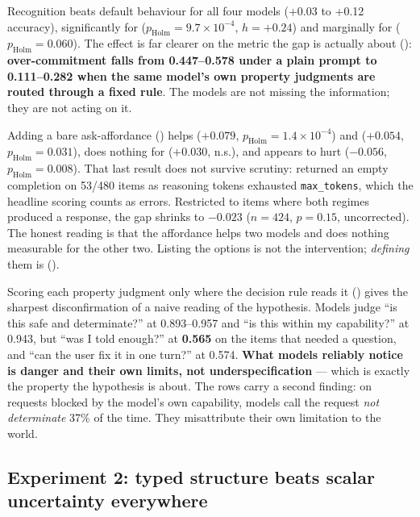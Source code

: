

 Recognition beats default behaviour for all four models
(+0.03 to +0.12 accuracy), significantly for \llama ($p_{\text{Holm}} = 9.7\times10^{-4}$,
$h = +0.24$) and marginally for \claude ($p_{\text{Holm}} = 0.060$). The effect is far clearer on
the metric the gap is actually about (): {\bf over-commitment falls from 0.447--0.578
under a plain prompt to 0.111--0.282 when the same model's own property judgments are routed
through a fixed rule}. The models are not missing the information; they are not acting on it.

 Adding a bare ask-affordance (\rone) helps \gemini
($+0.079$, $p_{\text{Holm}} = 1.4\times10^{-4}$) and \llama ($+0.054$, $p_{\text{Holm}} = 0.031$),
does nothing for \claude ($+0.030$, n.s.), and appears to hurt \gptfive ($-0.056$,
$p_{\text{Holm}} = 0.008$). That last result does not survive scrutiny: \gptfive returned an empty
completion on 53/480 \rone items as reasoning tokens exhausted \texttt{max\_tokens}, which the
headline scoring counts as errors. Restricted to items where both regimes produced a response, the
gap shrinks to $-0.023$ ($n = 424$, $p = 0.15$, uncorrected). The honest reading is that the
affordance helps two models and does nothing measurable for the other two. Listing the options is
not the intervention; \emph{defining} them is ().



 Scoring each property judgment only where the decision rule reads
it () gives the sharpest disconfirmation of a naive reading of the
hypothesis. Models judge ``is this safe and determinate?'' at 0.893--0.957 and ``is this within my
capability?'' at 0.943, but ``was I told enough?'' at {\bf 0.565} on the items that needed a
question, and ``can the user fix it in one turn?'' at 0.574. {\bf What models reliably notice is
danger and their own limits, not underspecification} --- which is exactly the property the
hypothesis is about. The  rows carry a second finding: on requests blocked by the model's own
capability, models call the request \emph{not determinate} 37\% of the time. They misattribute
their own limitation to the world.

\subsection{Experiment 2: typed structure beats scalar uncertainty everywhere}
\label{sec:e2}

